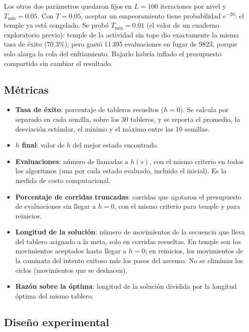 \documentclass[12pt,a4paper]{article}
\begin{document}
Los otros dos parámetros quedaron fijos en $L = 100$ iteraciones por
nivel y $T_{\min} = 0.05$. Con $T = 0.05$, aceptar un empeoramiento
tiene probabilidad $e^{-20}$: el temple ya está congelado. Se probó
$T_{\min} = 0.01$ (el valor de un cuaderno exploratorio previo): temple
de la actividad sin tope dio exactamente la misma tasa de éxito
(70.3\%), pero gastó 11\,395 evaluaciones en lugar de 9823, porque solo
alarga la cola del enfriamiento. Bajarlo habría inflado el presupuesto
compartido sin cambiar el resultado.

\subsection{Métricas}

\begin{itemize}
    \item \textbf{Tasa de éxito}: porcentaje de tableros resueltos
    ($h = 0$). Se calcula por separado en cada semilla, sobre los 30
    tableros, y se reporta el promedio, la desviación estándar, el
    mínimo y el máximo entre las 10 semillas.
    \item \textbf{$h$ final}: valor de $h$ del mejor estado encontrado.
    \item \textbf{Evaluaciones}: número de llamadas a $h(s)$, con el
    mismo criterio en todos los algoritmos (una por cada estado
    evaluado, incluido el inicial). Es la medida de costo
    computacional.
    \item \textbf{Porcentaje de corridas truncadas}: corridas que
    agotaron el presupuesto de evaluaciones sin llegar a $h = 0$, con
    el mismo criterio para temple y para reinicios.
    \item \textbf{Longitud de la solución}: número de movimientos de la
    secuencia que lleva del tablero asignado a la meta, solo en
    corridas resueltas. En temple son los movimientos aceptados hasta
    llegar a $h = 0$; en reinicios, los movimientos de la caminata del
    intento exitoso más los pasos del ascenso. No se eliminan los
    ciclos (movimientos que se deshacen).
    \item \textbf{Razón sobre la óptima}: longitud de la solución
    dividida por la longitud óptima del mismo tablero.
\end{itemize}

\subsection{Diseño experimental}
\end{document}
